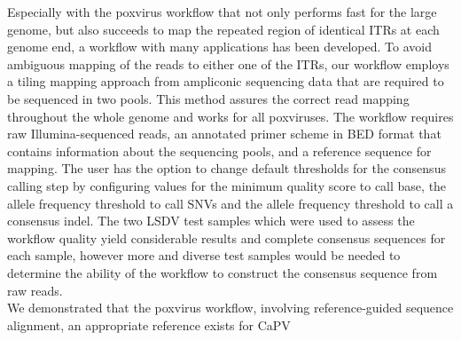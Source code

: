 Especially with the poxvirus workflow that not only performs fast for the large genome, but also succeeds to map the repeated region of identical \acp{ITR} at each genome end, a workflow with many applications has been developed. To avoid ambiguous mapping of the reads to either one of the \acp{ITR}, our workflow employs a tiling mapping approach from ampliconic sequencing data that are required to be sequenced in two pools. This method assures the correct read mapping throughout the whole genome and works for all poxviruses. The workflow requires raw Illumina-sequenced reads, an annotated primer scheme in \ac{BED} format that contains information about the sequencing pools, and a reference sequence for mapping. The user has the option to change default thresholds for the consensus calling step by configuring values for the minimum quality score to call base, the allele frequency threshold to call \acp{SNV} and the allele frequency threshold to call a consensus indel. The two \ac{LSDV} test samples which were used to assess the workflow quality yield considerable results and complete consensus sequences for each sample, however more and diverse test samples would be needed to determine the ability of the workflow to construct the consensus sequence from raw reads. \\
We demonstrated that the poxvirus workflow, involving reference-guided sequence alignment, an appropriate reference exists for CaPV

